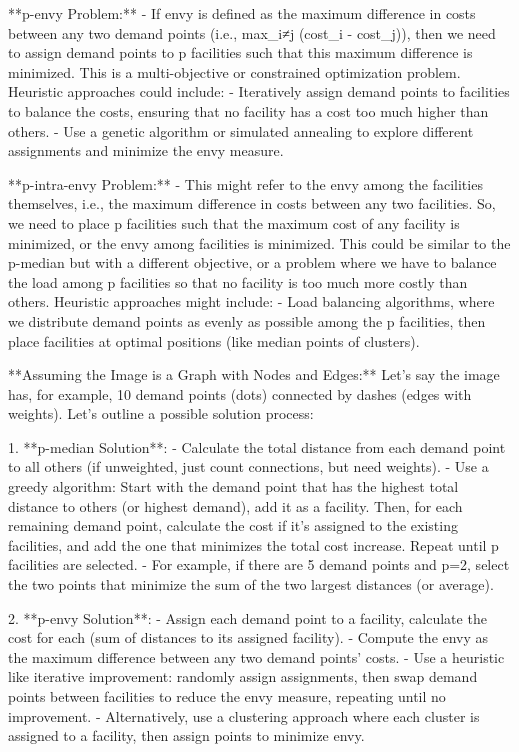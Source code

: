 **p-envy Problem:**
- If envy is defined as the maximum difference in costs between any two demand points (i.e., max_{i≠j} (cost_i - cost_j)), then we need to assign demand points to p facilities such that this maximum difference is minimized. This is a multi-objective or constrained optimization problem. Heuristic approaches could include:
  - Iteratively assign demand points to facilities to balance the costs, ensuring that no facility has a cost too much higher than others.
  - Use a genetic algorithm or simulated annealing to explore different assignments and minimize the envy measure.

**p-intra-envy Problem:**
- This might refer to the envy among the facilities themselves, i.e., the maximum difference in costs between any two facilities. So, we need to place p facilities such that the maximum cost of any facility is minimized, or the envy among facilities is minimized. This could be similar to the p-median but with a different objective, or a problem where we have to balance the load among p facilities so that no facility is too much more costly than others. Heuristic approaches might include:
  - Load balancing algorithms, where we distribute demand points as evenly as possible among the p facilities, then place facilities at optimal positions (like median points of clusters).

**Assuming the Image is a Graph with Nodes and Edges:**
Let's say the image has, for example, 10 demand points (dots) connected by dashes (edges with weights). Let's outline a possible solution process:

1. **p-median Solution**:
   - Calculate the total distance from each demand point to all others (if unweighted, just count connections, but need weights).
   - Use a greedy algorithm: Start with the demand point that has the highest total distance to others (or highest demand), add it as a facility. Then, for each remaining demand point, calculate the cost if it's assigned to the existing facilities, and add the one that minimizes the total cost increase. Repeat until p facilities are selected.
   - For example, if there are 5 demand points and p=2, select the two points that minimize the sum of the two largest distances (or average).

2. **p-envy Solution**:
   - Assign each demand point to a facility, calculate the cost for each (sum of distances to its assigned facility).
   - Compute the envy as the maximum difference between any two demand points' costs.
   - Use a heuristic like iterative improvement: randomly assign assignments, then swap demand points between facilities to reduce the envy measure, repeating until no improvement.
   - Alternatively, use a clustering approach where each cluster is assigned to a facility, then assign points to minimize envy.

